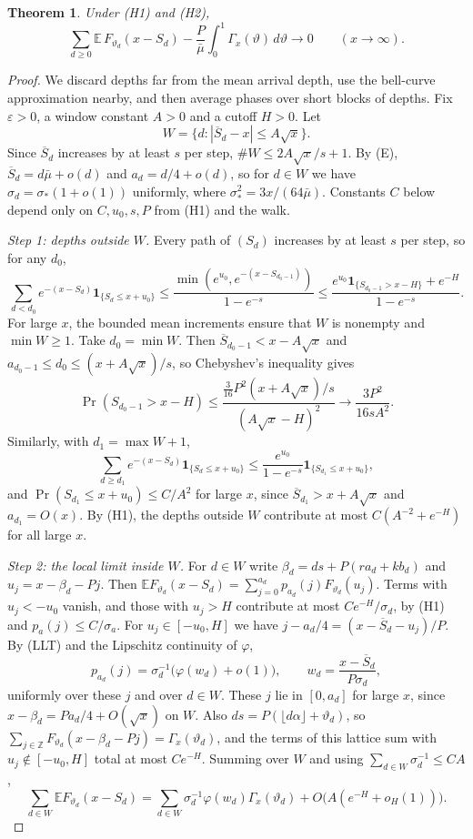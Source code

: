 \documentclass[11pt]{article}
\newtheorem{theorem}{Theorem}[section]
\theoremstyle{definition}
\theoremstyle{remark}
\newcommand{\Z}{\mathbb Z}
\newcommand{\one}{\mathbf 1}
\newcommand{\E}{\mathbb E}
\begin{document}
\begin{theorem}\label{thm:renewal}
Under (H1) and (H2),
\[
 \sum_{d\ge0}\E\,F_{\vartheta_d}(x-S_d)-\frac P{\bar\mu}\int_0^1\Gamma_x(\vartheta)\,d\vartheta
 \longrightarrow0\qquad(x\to\infty).
\]
\end{theorem}
\begin{proof}
We discard depths far from the mean arrival depth, use the bell-curve
approximation nearby, and then average phases over short blocks of depths.
Fix $\varepsilon>0$, a window constant $A>0$ and a cutoff $H>0$. Let
\[
 W=\{d:|\overline S_d-x|\le A\sqrt x\}.
\]
Since $\overline S_d$ increases by at least $s$ per step, $\#W\le2A\sqrt x/s+1$. By (E),
$\overline S_d=d\bar\mu+o(d)$ and $a_d=d/4+o(d)$, so for $d\in W$ we have
$\sigma_d=\sigma_*(1+o(1))$ uniformly, where $\sigma_*^2=3x/(64\bar\mu)$.
Constants $C$ below depend only on $C,u_0,s,P$ from (H1) and the walk.

\emph{Step 1: depths outside $W$.} Every path of $(S_d)$ increases by at
least $s$ per step, so for any $d_0$,
\[
 \sum_{d<d_0}e^{-(x-S_d)}\one_{\{S_d\le x+u_0\}}
 \le\frac{\min(e^{u_0},e^{-(x-S_{d_0-1})})}{1-e^{-s}}
 \le\frac{e^{u_0}\one_{\{S_{d_0-1}>x-H\}}+e^{-H}}{1-e^{-s}} .
\]
For large $x$, the bounded mean increments ensure that $W$ is nonempty
and $\min W\ge1$. Take $d_0=\min W$. Then
$\overline S_{d_0-1}<x-A\sqrt x$ and
$a_{d_0-1}\le d_0\le(x+A\sqrt x)/s$,
so Chebyshev's inequality gives
\[
 \Pr(S_{d_0-1}>x-H)\le\frac{\tfrac3{16}P^2(x+A\sqrt x)/s}{(A\sqrt x-H)^2}
 \longrightarrow\frac{3P^2}{16sA^2}.
\]
Similarly, with $d_1=\max W+1$,
\[
 \sum_{d\ge d_1}e^{-(x-S_d)}\one_{\{S_d\le x+u_0\}}
 \le\frac{e^{u_0}}{1-e^{-s}}\one_{\{S_{d_1}\le x+u_0\}},
\]
and $\Pr(S_{d_1}\le x+u_0)\le C/A^2$ for large $x$, since $\overline S_{d_1}>x+A\sqrt x$
and $a_{d_1}=O(x)$. By (H1), the depths outside $W$ contribute at most
$C(A^{-2}+e^{-H})$ for all large $x$.

\emph{Step 2: the local limit inside $W$.} For $d\in W$ write
$\beta_d=ds+P(ra_d+kb_d)$ and $u_j=x-\beta_d-Pj$. Then
$\E F_{\vartheta_d}(x-S_d)=\sum_{j=0}^{a_d}p_{a_d}(j)F_{\vartheta_d}(u_j)$.
Terms with $u_j<-u_0$ vanish, and those with $u_j>H$ contribute at most
$Ce^{-H}/\sigma_d$, by (H1) and $p_a(j)\le C/\sigma_a$. For $u_j\in[-u_0,H]$
we have $j-a_d/4=(x-\overline S_d-u_j)/P$. By (LLT) and the Lipschitz continuity of
$\varphi$,
\[
 p_{a_d}(j)=\sigma_d^{-1}\big(\varphi(w_d)+o(1)\big),\qquad
 w_d=\frac{x-\overline S_d}{P\sigma_d},
\]
uniformly over these $j$ and over $d\in W$. These $j$ lie in $[0,a_d]$ for
large $x$, since $x-\beta_d=Pa_d/4+O(\sqrt x)$ on $W$. Also
$ds=P(\lfloor d\alpha\rfloor+\vartheta_d)$, so
$\sum_{j\in\Z}F_{\vartheta_d}(x-\beta_d-Pj)=\Gamma_x(\vartheta_d)$, and the
terms of this lattice sum with $u_j\notin[-u_0,H]$ total at most $Ce^{-H}$.
Summing over $W$ and using $\sum_{d\in W}\sigma_d^{-1}\le CA$,
\[
 \sum_{d\in W}\E F_{\vartheta_d}(x-S_d)
 =\sum_{d\in W}\sigma_d^{-1}\varphi(w_d)\Gamma_x(\vartheta_d)
 +O\big(A(e^{-H}+o_H(1))\big).
\]


\end{proof}
\end{document}
